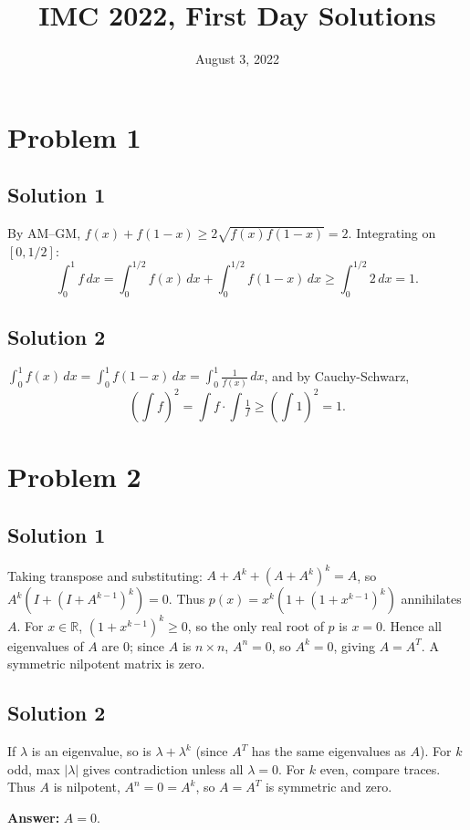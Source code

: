 \documentclass{article}
\title{IMC 2022, First Day Solutions}
\date{August 3, 2022}
\begin{document}
\maketitle

\section*{Problem 1}
\subsection*{Solution 1}
By AM--GM, $f(x) + f(1-x) \geq 2\sqrt{f(x) f(1-x)} = 2$. Integrating on $[0, 1/2]$:
\[ \int_0^1 f\, dx = \int_0^{1/2} f(x)\, dx + \int_0^{1/2} f(1-x)\, dx \geq \int_0^{1/2} 2\, dx = 1. \]

\subsection*{Solution 2}
$\int_0^1 f(x)\, dx = \int_0^1 f(1-x)\, dx = \int_0^1 \frac{1}{f(x)}\, dx$, and by Cauchy-Schwarz,
\[ \left(\int f\right)^2 = \int f \cdot \int \tfrac{1}{f} \geq \left(\int 1\right)^2 = 1. \]

\section*{Problem 2}
\subsection*{Solution 1}
Taking transpose and substituting: $A + A^k + (A + A^k)^k = A$, so $A^k(I + (I + A^{k-1})^k) = 0$. Thus $p(x) = x^k(1 + (1 + x^{k-1})^k)$ annihilates $A$. For $x \in \mathbb{R}$, $(1 + x^{k-1})^k \geq 0$, so the only real root of $p$ is $x = 0$. Hence all eigenvalues of $A$ are $0$; since $A$ is $n \times n$, $A^n = 0$, so $A^k = 0$, giving $A = A^T$. A symmetric nilpotent matrix is zero.

\subsection*{Solution 2}
If $\lambda$ is an eigenvalue, so is $\lambda + \lambda^k$ (since $A^T$ has the same eigenvalues as $A$). For $k$ odd, max $|\lambda|$ gives contradiction unless all $\lambda = 0$. For $k$ even, compare traces. Thus $A$ is nilpotent, $A^n = 0 = A^k$, so $A = A^T$ is symmetric and zero.

\textbf{Answer:} $A = 0$.
\end{document}
